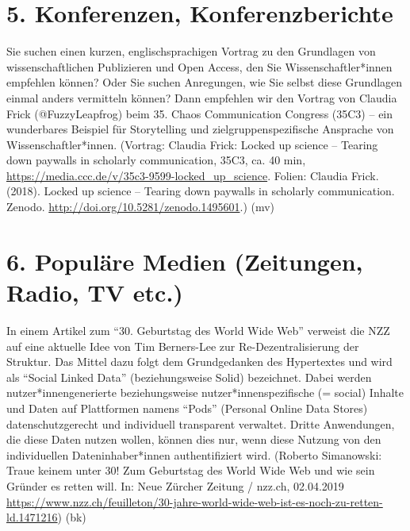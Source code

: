 \documentclass[a4paper,
fontsize=11pt,
oneside,
numbers=noperiodatend,
parskip=half-,
bibliography=totoc,
final
]{scrartcl}
\begin{document}
\hypertarget{konferenzen-konferenzberichte}{%
\section{5. Konferenzen,
Konferenzberichte}\label{konferenzen-konferenzberichte}}

Sie suchen einen kurzen, englischsprachigen Vortrag zu den Grundlagen
von wissenschaftlichen Publizieren und Open Access, den Sie
Wissenschaftler*innen empfehlen können? Oder Sie suchen Anregungen, wie
Sie selbst diese Grundlagen einmal anders vermitteln können? Dann
empfehlen wir den Vortrag von Claudia Frick (@FuzzyLeapfrog) beim 35.
Chaos Communication Congress (35C3) -- ein wunderbares Beispiel für
Storytelling und zielgruppenspezifische Ansprache von
Wissenschaftler*innen. (Vortrag: Claudia Frick: Locked up science --
Tearing down paywalls in scholarly communication, 35C3, ca. 40 min,
\url{https://media.ccc.de/v/35c3-9599-locked_up_science}. Folien:
Claudia Frick. (2018). Locked up science -- Tearing down paywalls in
scholarly communication. Zenodo.
\url{http://doi.org/10.5281/zenodo.1495601}.) (mv)

\hypertarget{populuxe4re-medien-zeitungen-radio-tv-etc.}{%
\section{6. Populäre Medien (Zeitungen, Radio, TV
etc.)}\label{populuxe4re-medien-zeitungen-radio-tv-etc.}}

In einem Artikel zum \enquote{30. Geburtstag des World Wide Web}
verweist die NZZ auf eine aktuelle Idee von Tim Berners-Lee zur
Re-Dezentralisierung der Struktur. Das Mittel dazu folgt dem
Grundgedanken des Hypertextes und wird als \enquote{Social Linked Data}
(beziehungsweise Solid) bezeichnet. Dabei werden nutzer*innengenerierte
beziehungsweise nutzer*innenspezifische (= social) Inhalte und Daten auf
Plattformen namens \enquote{Pods} (Personal Online Data Stores)
datenschutzgerecht und individuell transparent verwaltet. Dritte
Anwendungen, die diese Daten nutzen wollen, können dies nur, wenn diese
Nutzung von den individuellen Dateninhaber*innen authentifiziert wird.
(Roberto Simanowski: Traue keinem unter 30! Zum Geburtstag des World
Wide Web und wie sein Gründer es retten will. In: Neue Zürcher Zeitung /
nzz.ch, 02.04.2019
\url{https://www.nzz.ch/feuilleton/30-jahre-world-wide-web-ist-es-noch-zu-retten-ld.1471216})
(bk)
\end{document}
